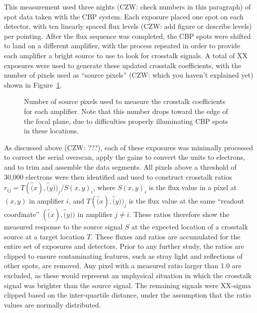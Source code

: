 This measurement used three nights (CZW: check numbers in this paragraph) of spot data taken with the CBP system.
Each exposure placed one spot on each detector, with ten linearly spaced flux levels (CZW: add figure or describe levels) per pointing.
After the flux sequence was completed, the CBP spots were shifted to land on a different amplifier, with the process repeated in order to provide each amplifier a bright source to use to look for crosstalk signals.
A total of XX exposures were used to generate these updated crosstalk coefficients, with the number of pixels used as ``source pixels'' (CZW: which you haven't explained yet) shown in Figure~\ref{fig:crosstalk-source-pixels}.

\begin{figure}[t]
    \centering
    \caption{Number of source pixels used to measure the crosstalk coefficients for each amplifier.
      Note that this number drops toward the edge of the focal plane, due to difficulties properly illuminating CBP spots in these locations.}
    \label{fig:crosstalk-source-pixels}
\end{figure}

As discussed above (CZW: ???), each of these exposures was minimally processed to correct the serial overscan, apply the gains to convert the units to electrons, and to trim and assemble the data segments.
All pixels above a threshold of 30,000 electrons were then identified and used to construct crosstalk ratios $r_{ij} = T(\hat(x), \hat(y))_j / S(x, y)_i$, where $S(x, y)_i$ is the flux value in a pixel at $(x, y)$ in amplifier $i$, and $T(\hat(x), \hat(y))_j$ is the flux value at the same ``readout coordinate'' $(\hat(x), \hat(y))$ in amplifier $j \ne i$.
These ratios therefore show the measured response to the source signal $S$ at the expected location of a crosstalk source at a target location $T$.
These fluxes and ratios are accumulated for the entire set of exposures and detectors.
Prior to any further study, the ratios are clipped to ensure contaminating features, such as stray light and reflections of other spots, are removed.
Any pixel with a measured ratio larger than 1.0 are excluded, as these would represent an unphysical situation in which the crosstalk signal was brighter than the source signal.
The remaining signals were XX-sigma clipped based on the inter-quartile distance, under the assumption that the ratio values are normally distributed.

